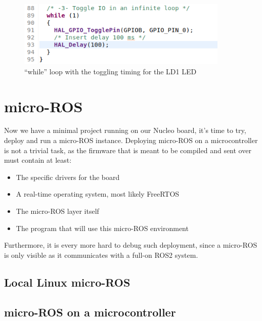 \documentclass[10pt]{article}
\begin{document}
\begin{figure}[h!]
  \centering
  \includegraphics[width=0.9\textwidth]{./img/toggle_led.png}
  \caption{``while'' loop with the toggling timing for the LD1 LED}
  \label{fig:toggle_led}
\end{figure}

\pagebreak
\section{micro-ROS}
\label{sec:micro-ros}
Now we have a minimal project running on our Nucleo board, it's time to try, deploy and run a micro-ROS instance.
Deploying micro-ROS on a microcontroller is not a trivial task, as the firmware that is meant to be compiled and sent over must contain at least:
\begin{itemize}
\item The specific drivers for the board
\item A real-time operating system, most likely FreeRTOS
\item The micro-ROS layer itself
\item The program that will use this micro-ROS environment
\end{itemize}

Furthermore, it is every more hard to debug such deployment, since a micro-ROS is only visible as it communicates with a full-on ROS2 system.

\subsection{Local Linux micro-ROS}
\label{sec:local-linux-micro}

\subsection{micro-ROS on a microcontroller}
\label{sec:micro-ros-micr}
\end{document}
